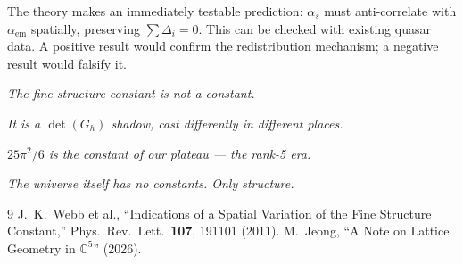 \documentclass[12pt]{article}
\theoremstyle{remark}
\begin{document}
The theory makes an immediately testable prediction: $\alpha_s$ must anti-correlate with $\alpha_\text{em}$ spatially, preserving $\sum\Delta_i = 0$. This can be checked with existing quasar data. A positive result would confirm the redistribution mechanism; a negative result would falsify it.

\begin{center}
\emph{The fine structure constant is not a constant.}

\emph{It is a $\det(G_h)$ shadow, cast differently in different places.}

\emph{$25\pi^2/6$ is the constant of our plateau --- the rank-5 era.}

\emph{The universe itself has no constants. Only structure.}
\end{center}

\begin{thebibliography}{9}
 J.~K.~Webb et al., ``Indications of a Spatial Variation of the Fine Structure Constant,'' Phys.~Rev.~Lett.\ \textbf{107}, 191101 (2011).
 M.~Jeong, ``A Note on Lattice Geometry in $\mathbb{C}^5$'' (2026).
\end{thebibliography}
\end{document}
